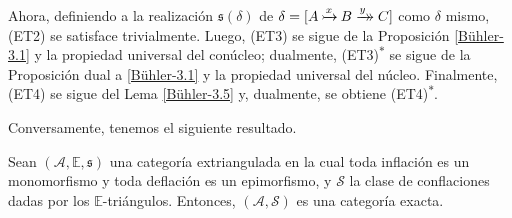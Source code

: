 \documentclass[tesis]{subfiles}
\begin{document}
\begin{Ejem}
    Ahora, definiendo a la realización $\mathfrak{s}(\delta)$ de $\delta = [A\xrightarrow[]{x}\mathrel{\mkern-21mu}\rightarrowtail B\xrightarrow[]{y}\mathrel{\mkern-14mu}\rightarrow C]$ como $\delta$ mismo, (ET2) se satisface trivialmente. Luego, (ET3) se sigue de la Proposición \ref{Bühler-3.1} y la propiedad universal del conúcleo; dualmente, (ET3)\textsuperscript{$\ast$} se sigue de la Proposición dual a \ref{Bühler-3.1} y la propiedad universal del núcleo. Finalmente, (ET4) se sigue del Lema \ref{Bühler-3.5} y, dualmente, se obtiene (ET4)\textsuperscript{$\ast$}.
\end{Ejem}

Conversamente, tenemos el siguiente resultado.

\begin{Coro}\cite[Corollary 3.18]{NakaokaPalu}\label{NakaokaPalu-3.18}
    Sean $(\mathscr{A},\mathbb{E},\mathfrak{s})$ una categoría extriangulada en la cual toda inflación es un monomorfismo y toda deflación es un epimorfismo, y $\mathscr{S}$ la clase de conflaciones dadas por los $\mathbb{E}$-triángulos. Entonces, $(\mathscr{A},\mathscr{S})$ es una categoría exacta.
\end{Coro}
\end{document}
